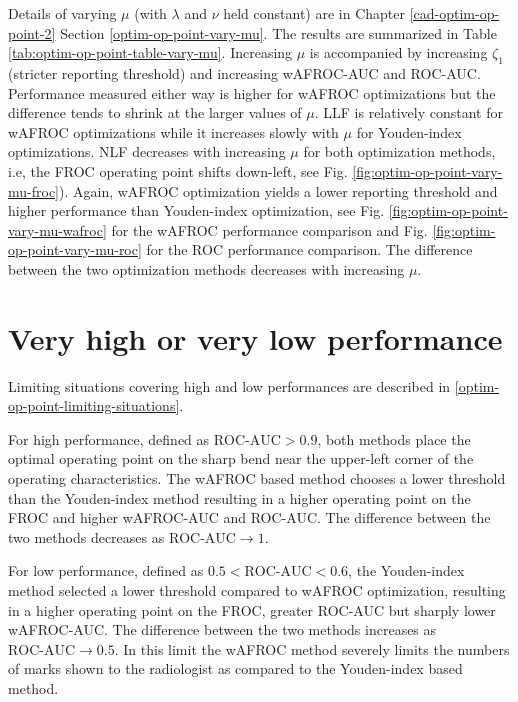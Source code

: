 \documentclass[
]{book}
\begin{document}
Details of varying \(\mu\) (with \(\lambda\) and \(\nu\) held constant) are in Chapter \ref{cad-optim-op-point-2} Section \ref{optim-op-point-vary-mu}. The results are summarized in Table \ref{tab:optim-op-point-table-vary-mu}. Increasing \(\mu\) is accompanied by increasing \(\zeta_1\) (stricter reporting threshold) and increasing wAFROC-AUC and ROC-AUC. Performance measured either way is higher for wAFROC optimizations but the difference tends to shrink at the larger values of \(\mu\). LLF is relatively constant for wAFROC optimizations while it increases slowly with \(\mu\) for Youden-index optimizations. NLF decreases with increasing \(\mu\) for both optimization methods, i.e, the FROC operating point shifts down-left, see Fig. \ref{fig:optim-op-point-vary-mu-froc}). Again, wAFROC optimization yields a lower reporting threshold and higher performance than Youden-index optimization, see Fig. \ref{fig:optim-op-point-vary-mu-wafroc} for the wAFROC performance comparison and Fig. \ref{fig:optim-op-point-vary-mu-roc} for the ROC performance comparison. The difference between the two optimization methods decreases with increasing \(\mu\).

\hypertarget{optim-op-point-vary-nu-limiting-situations}{%
\section{Very high or very low performance}\label{optim-op-point-vary-nu-limiting-situations}}

Limiting situations covering high and low performances are described in \ref{optim-op-point-limiting-situations}.

For high performance, defined as \(\text{ROC-AUC} > 0.9\), both methods place the optimal operating point on the sharp bend near the upper-left corner of the operating characteristics. The wAFROC based method chooses a lower threshold than the Youden-index method resulting in a higher operating point on the FROC and higher wAFROC-AUC and ROC-AUC. The difference between the two methods decreases as \(\text{ROC-AUC} \rightarrow 1\).

For low performance, defined as \(0.5 < \text{ROC-AUC} < 0.6\), the Youden-index method selected a lower threshold compared to wAFROC optimization, resulting in a higher operating point on the FROC, greater ROC-AUC but sharply lower wAFROC-AUC. The difference between the two methods increases as \(\text{ROC-AUC} \rightarrow 0.5\). In this limit the wAFROC method severely limits the numbers of marks shown to the radiologist as compared to the Youden-index based method.
\end{document}

